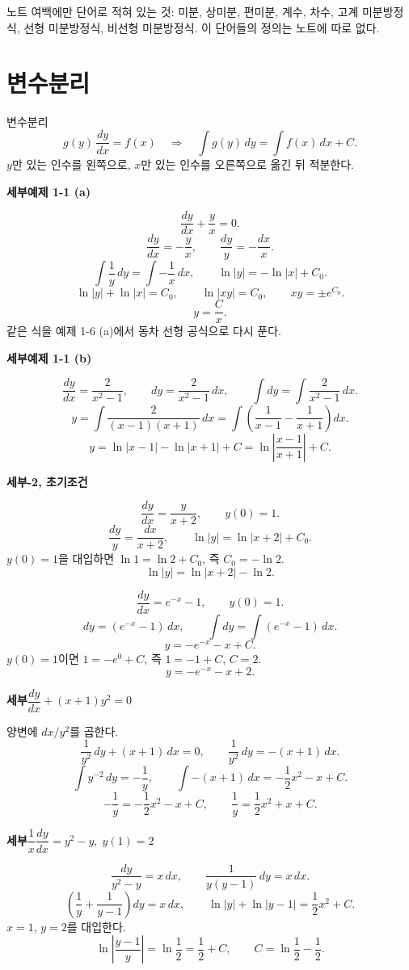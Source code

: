 \documentclass[11pt]{article}
\newcommand{\ex}[1]{\par\textbf{세부\quad #1}\par}
\begin{document}
노트 여백에만 단어로 적혀 있는 것: 미분, 상미분, 편미분, 계수, 차수, 고계 미분방정식, 선형 미분방정식, 비선형 미분방정식. 이 단어들의 정의는 노트에 따로 없다.

\section{변수분리}

\begin{mainbox}{변수분리}
\[
g(y)\,\frac{dy}{dx}=f(x)
\quad\Longrightarrow\quad
\int g(y)\,dy=\int f(x)\,dx+C.
\]
\(y\)만 있는 인수를 왼쪽으로, \(x\)만 있는 인수를 오른쪽으로 옮긴 뒤 적분한다.
\end{mainbox}

\ex{예제 1-1 (a)}
\[
\frac{dy}{dx}+\frac{y}{x}=0.
\]
\[
\frac{dy}{dx}=-\frac{y}{x},\qquad
\frac{dy}{y}=-\frac{dx}{x}.
\]
\[
\int\frac{1}{y}\,dy=\int-\frac{1}{x}\,dx,\qquad
\ln|y|=-\ln|x|+C_0.
\]
\[
\ln|y|+\ln|x|=C_0,\qquad
\ln|xy|=C_0,\qquad
xy=\pm e^{C_0}.
\]
\[
y=\frac{C}{x}.
\]
같은 식을 예제 1-6 (a)에서 동차 선형 공식으로 다시 푼다.

\ex{예제 1-1 (b)}
\[
\frac{dy}{dx}=\frac{2}{x^{2}-1},\qquad
dy=\frac{2}{x^{2}-1}\,dx,\qquad
\int dy=\int\frac{2}{x^{2}-1}\,dx.
\]
\[
y=\int\frac{2}{(x-1)(x+1)}\,dx
=\int\left(\frac{1}{x-1}-\frac{1}{x+1}\right)dx.
\]
\[
y=\ln|x-1|-\ln|x+1|+C
=\ln\left|\frac{x-1}{x+1}\right|+C.
\]

\ex{1-2, 초기조건}
\[
\frac{dy}{dx}=\frac{y}{x+2},\qquad y(0)=1.
\]
\[
\frac{dy}{y}=\frac{dx}{x+2},\qquad
\ln|y|=\ln|x+2|+C_0.
\]
\(y(0)=1\)을 대입하면 \(\ln 1=\ln 2+C_0\), 즉 \(C_0=-\ln 2\).
\[
\ln|y|=\ln|x+2|-\ln 2.
\]

\[
\frac{dy}{dx}=e^{-x}-1,\qquad y(0)=1.
\]
\[
dy=(e^{-x}-1)\,dx,\qquad
\int dy=\int(e^{-x}-1)\,dx.
\]
\[
y=-e^{-x}-x+C.
\]
\(y(0)=1\)이면 \(1=-e^{0}+C\), 즉 \(1=-1+C\), \(C=2\).
\[
y=-e^{-x}-x+2.
\]

\ex{\(\dfrac{dy}{dx}+(x+1)y^{2}=0\)}
양변에 \(dx/y^{2}\)를 곱한다.
\[
\frac{1}{y^{2}}\,dy+(x+1)\,dx=0,\qquad
\frac{1}{y^{2}}\,dy=-(x+1)\,dx.
\]
\[
\int y^{-2}\,dy=-\frac{1}{y},\qquad
\int-(x+1)\,dx=-\frac12 x^{2}-x+C.
\]
\[
-\frac{1}{y}=-\frac12 x^{2}-x+C,\qquad
\frac{1}{y}=\frac12 x^{2}+x+C.
\]

\ex{\(\dfrac{1}{x}\dfrac{dy}{dx}=y^{2}-y,\; y(1)=2\)}
\[
\frac{dy}{y^{2}-y}=x\,dx,\qquad
\frac{1}{y(y-1)}\,dy=x\,dx.
\]
\[
\left(\frac{1}{y}+\frac{1}{y-1}\right)dy=x\,dx,\qquad
\ln|y|+\ln|y-1|=\frac12 x^{2}+C.
\]
\(x=1\), \(y=2\)를 대입한다.
\[
\ln\left|\frac{y-1}{y}\right|=\ln\frac12=\frac12+C,\qquad
C=\ln\frac12-\frac12.
\]
\end{document}
